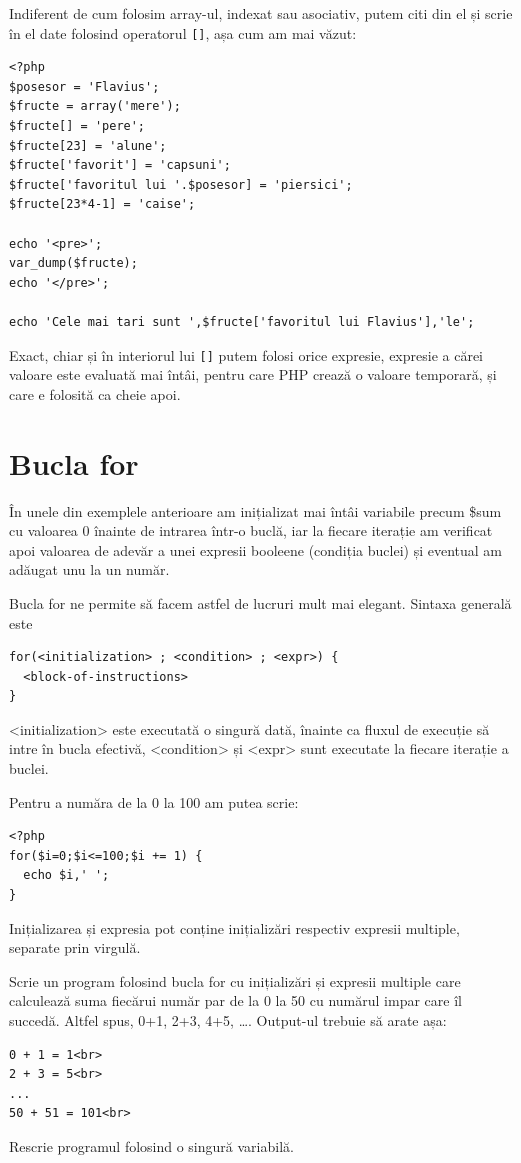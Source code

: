 Indiferent de cum folosim array-ul, indexat sau asociativ, putem citi din el și
scrie în el date folosind operatorul \texttt{[]}, așa cum am mai văzut:
\begin{lstlisting}
<?php
$posesor = 'Flavius';
$fructe = array('mere');
$fructe[] = 'pere';
$fructe[23] = 'alune';
$fructe['favorit'] = 'capsuni';
$fructe['favoritul lui '.$posesor] = 'piersici';
$fructe[23*4-1] = 'caise';

echo '<pre>';
var_dump($fructe);
echo '</pre>';

echo 'Cele mai tari sunt ',$fructe['favoritul lui Flavius'],'le';
\end{lstlisting}
Exact, chiar și în interiorul lui \texttt{[]} putem folosi orice expresie,
expresie a cărei valoare este evaluată mai întâi, pentru care PHP
crează o valoare temporară, și care e folosită ca cheie apoi.

\section{Bucla for}
În unele din exemplele anterioare am inițializat mai întâi variabile
precum \$sum cu valoarea 0 înainte de intrarea într-o buclă,
iar la fiecare iterație am verificat apoi valoarea 
de adevăr a unei expresii booleene (condiția buclei) și eventual
am adăugat unu la un număr.

Bucla for ne permite să facem astfel de lucruri mult mai elegant.
Sintaxa generală este
\begin{verbatim}
for(<initialization> ; <condition> ; <expr>) {
  <block-of-instructions>
}
\end{verbatim}
<initialization> este executată o singură dată, înainte ca
fluxul de execuție să intre în bucla efectivă,
<condition> și <expr> sunt executate la fiecare iterație
a buclei.

Pentru a număra de la 0 la 100 am putea scrie:
\begin{lstlisting}
<?php
for($i=0;$i<=100;$i += 1) {
  echo $i,' ';
}
\end{lstlisting}

Inițializarea și expresia pot conține inițializări 
respectiv expresii multiple, separate prin virgulă.

\begin{Exercise}[title={Două câte două},difficulty=2]

\ExePart

Scrie un program folosind bucla for cu inițializări și expresii
multiple care calculează suma fiecărui număr par de la 0 la 50
cu numărul impar care îl succedă. Altfel spus, 0+1, 2+3,
4+5, \ldots. Output-ul trebuie să arate așa:
\begin{verbatim}
0 + 1 = 1<br>
2 + 3 = 5<br>
...
50 + 51 = 101<br>
\end{verbatim}
\ExePart
Rescrie programul folosind o singură variabilă.
\end{Exercise}



